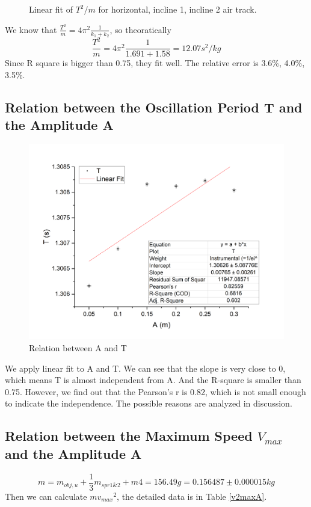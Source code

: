 \documentclass[12pt,a4paper]{article}
\begin{document}
\begin{center}
\begin{figure}[H]
        \caption{Linear fit of $T^2/m$ for horizontal, incline 1, incline 2 air track.}
        \label{tsquarefigure}
        \end{figure}
    \end{center}

We know that $\frac{T^2}{m}=4\pi^2\frac{1}{k_1+k_2}$, so theoratically
$$\frac{T^2}{m}=4\pi^2\frac{1}{1.691+1.58}=12.07s^2/kg$$
Since R square is bigger than 0.75, they fit well. The relative error is 3.6\%, 4.0\%, 3.5\%.

\subsection{Relation between the Oscillation Period T and the Amplitude A}

\begin{figure}[H]
    \centering
    \includegraphics[scale=0.32]{amplitude.png}
    \caption{Relation between A and T}
    \label{figureAT}
\end{figure}

We apply linear fit to A and T. We can see that the slope is very close to 0, which means T is 
almost independent from A. And the R-square is smaller than 0.75. However, we find out that the Pearson’s r is 0.82, which is not small enough to indicate the independence. The possible reasons are analyzed in discussion.

\subsection{Relation between the Maximum Speed $V_{max}$  and the Amplitude A}
$$m=m_{obj,u}+\frac{1}{3}m_{spr1\&2}+m4=156.49g=0.156487\pm0.000015kg$$
Then we can calculate $m{v_{max}}^2$, the detailed data is in Table \ref{v2maxA}.
\end{document}
